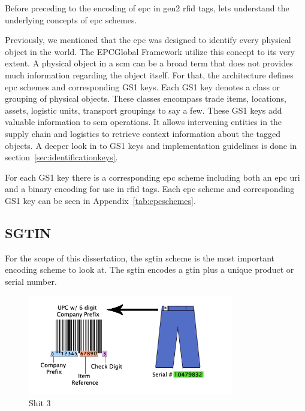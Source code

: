 Before preceding to the encoding of \ac{epc} in \ac{gen2} \ac{rfid} tags, lets understand the underlying concepts of \ac{epc} schemes.

Previously, we mentioned that the \ac{epc} was designed to identify every physical object in the world.
The EPCGlobal Framework utilize this concept to its very extent.
A physical object in a \ac{scm} can be a broad term that does not provides much information regarding the object itself.
For that, the architecture defines \ac{epc} schemes and corresponding GS1 keys.
Each GS1 key denotes a class or grouping of physical objects. These classes encompass trade items, locations, assets, logistic units, transport groupings to say a few.
These GS1 keys add valuable information to \ac{scm} operations.
It allows intervening entities in the supply chain and logistics to retrieve context information about the tagged objects.
A deeper look in to GS1 keys and implementation guidelines is done in section~\ref{sec:identificationkeys}.

For each GS1 key there is a corresponding \ac{epc} scheme including both an \ac{epc} \ac{uri} and a binary encoding for use in \ac{rfid} tags.
Each \ac{epc} scheme and corresponding GS1 key can be seen in Appendix~\ref{tab:epcschemes}.

\subsection{SGTIN}

For the scope of this dissertation, the \ac{sgtin} scheme is the most important encoding scheme to look at.
The \ac{sgtin} encodes a \ac{gtin} plus a unique product or serial number.

\begin{figure}[!ht]
    \centering
    \includegraphics[width=0.8\textwidth]{./figs/02-state-of-the-art/SGTIN_UPC_Compare.jpg}
    \caption{Shit 3~\cite{SGTININFO}} 
    \label{fig:3333}
\end{figure}

